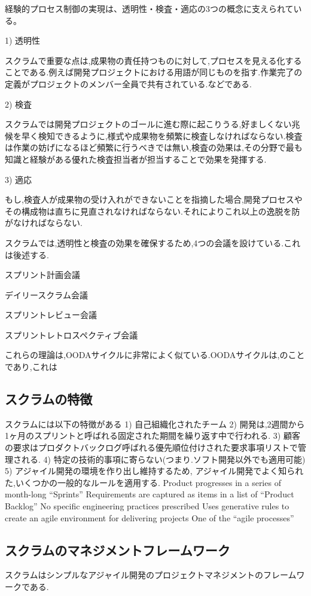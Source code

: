 \documentclass[paper]{jrsj}
\begin{document}
経験的プロセス制御の実現は、透明性・検査・適応の3つの概念に支えられている。

1)	透明性

スクラムで重要な点は,成果物の責任持つものに対して,プロセスを見える化することである.例えば開発プロジェクトにおける用語が同じものを指す.作業完了の定義がプロジェクトのメンバー全員で共有されている.などである.

2)	検査

スクラムでは開発プロジェクトのゴールに進む際に起こりうる,好ましくない兆候を早く検知できるように,様式や成果物を頻繁に検査しなければならない.検査は作業の妨げになるほど頻繁に行うべきでは無い,検査の効果は,その分野で最も知識と経験がある優れた検査担当者が担当することで効果を発揮する.

3)	適応

もし,検査人が成果物の受け入れができないことを指摘した場合,開発プロセスやその構成物は直ちに見直されなければならない.それによりこれ以上の逸脱を防がなければならない.

スクラムでは,透明性と検査の効果を確保するため,4つの会議を設けている.これは後述する.

スプリント計画会議

デイリースクラム会議

スプリントレビュー会議

スプリントレトロスペクティブ会議

これらの理論は,OODAサイクルに非常によく似ている.OODAサイクルは,のことであり,これは

\subsection{スクラムの特徴}

スクラムには以下の特徴がある
1)	自己組織化されたチーム
2)	開発は,2週間から1ヶ月のスプリントと呼ばれる固定された期間を繰り返す中で行われる.
3)	顧客の要求はプロダクトバックログ呼ばれる優先順位付けされた要求事項リストで管理される.
4)	特定の技術的事項に寄らない(つまり.ソフト開発以外でも適用可能)
5)	アジャイル開発の環境を作り出し維持するため, アジャイル開発でよく知られた,いくつかの一般的なルールを適用する.
Product progresses in a series of month-long “Sprints”
Requirements are captured as items in a list of “Product Backlog”
No specific engineering practices prescribed
Uses generative rules to create an agile environment for delivering projects
One of the “agile processes”

\subsection{スクラムのマネジメントフレームワーク}
スクラムはシンプルなアジャイル開発のプロジェクトマネジメントのフレームワークである. 
\end{document}
